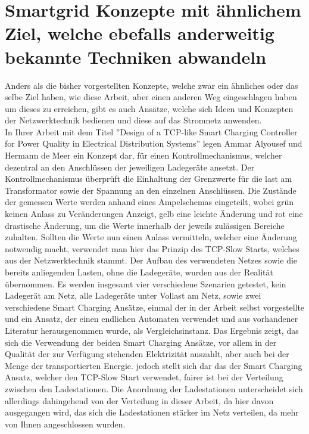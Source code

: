 \section{Smartgrid Konzepte mit ähnlichem Ziel, welche ebefalls anderweitig bekannte Techniken abwandeln}
Anders als die bisher vorgestellten Konzepte, welche zwar ein ähnliches oder das selbe Ziel haben, wie diese Arbeit, aber einen anderen Weg eingeschlagen haben um dieses zu erreichen, gibt es auch Ansätze, welche sich Ideen und Konzepten der Netzwerktechnik bedienen und diese auf das Stromnetz anwenden. \\
In Ihrer Arbeit mit dem Titel ''Design of a TCP-like Smart Charging Controller for Power Quality in Electrical Distribution Systems''\cite{RW_3_1} legen  Ammar  Alyousef und Hermann de Meer ein Konzept dar, für einen Kontrollmechanismus, welcher dezentral an den Anschlüssen der jeweiligen Ladegeräte ansetzt. Der Kontrollmechanismus überprüft die Einhaltung der Grenzwerte für die last am Transformator sowie der Spannung an den einzelnen Anschlüssen. Die Zustände der gemessen Werte werden anhand eines Ampelschemas eingeteilt, wobei grün keinen Anlass zu Veränderungen Anzeigt, gelb eine leichte Änderung und rot eine drastische Änderung, um die Werte innerhalb der jeweils zulässigen Bereiche zuhalten. Sollten die Werte nun einen Anlass vermitteln, welcher eine Änderung notwendig macht, verwendet man hier das Prinzip des TCP-Slow Starts, welches aus der Netzwerktechnik stammt. Der Aufbau des verwendeten Netzes sowie die bereits anliegenden Lasten, ohne die Ladegeräte, wurden aus der Realität übernommen. Es werden insgesamt vier verschiedene Szenarien getestet, kein Ladegerät am Netz, alle Ladegeräte unter Vollast am Netz, sowie zwei verschiedene Smart Charging Ansätze, einmal der in der Arbeit selbst vorgestellte und ein Ansatz, der einen endlichen Automaten verwendet und aus vorhandener Literatur herausgenommen wurde, als Vergleichsinstanz. Das Ergebnis zeigt, das sich die Verwendung der beiden Smart Charging Ansätze, vor allem in der Qualität der zur Verfügung stehenden Elektrizität auszahlt, aber auch bei der Menge der transportierten Energie. jedoch stellt sich dar das der Smart Charging Ansatz, welcher den TCP-Slow Start verwendet, fairer ist bei der Verteilung zwischen den Ladestationen. Die Anordnung der Ladestationen unterscheidet sich allerdings dahingehend von der Verteilung in dieser Arbeit, da hier davon ausgegangen wird, das sich die Ladestationen stärker im Netz verteilen, da mehr von Ihnen angeschlossen wurden.
\\
\\





